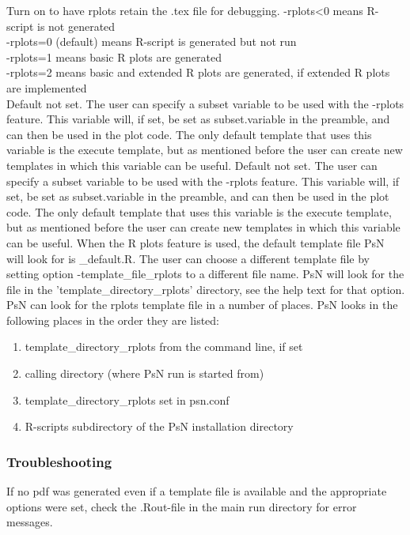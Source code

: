 \begin{optionlist}
Turn on to have rplots retain the .tex file for debugging.
\nextopt
{}
-rplots<0 means R-script is not generated\\ 
-rplots=0 (default) means R-script is generated but not run\\ 
-rplots=1 means basic R plots are generated\\													  
-rplots=2 means basic and extended R plots are generated, if extended R plots are implemented\\													  
\nextopt
{}
Default not set. The user can specify a subset variable to be used with the -rplots feature. This variable will, if set, be set as subset.variable in the preamble, and can then be used in the plot code. The only default template that uses this variable is the execute template, but as mentioned before the user can create new templates in which this variable can be useful.
\nextopt
{}
Default not set. The user can specify a subset variable to be used with the -rplots feature. This variable will, if set, be set as subset.variable in the preamble, and can then be used in the plot code.  The only default template that uses this variable is the execute template, but as mentioned before the user can create new templates in which this variable can be useful.
\nextopt
{}
When the R plots feature is used, the default template file PsN will look for is \guidetoolname\_default.R. The user can choose a different template file by setting option -template\_file\_rplots to a different file name. PsN will look for the file in the 'template\_directory\_rplots' directory, see the help text for that option.
\nextopt
{}
PsN can look for the rplots template file in a number of places. PsN looks in the following places in the order they are listed:
\begin{enumerate}
\item template\_directory\_rplots from the command line, if set 
\item calling directory (where PsN run is started from)
\item template\_directory\_rplots set in psn.conf 
\item R-scripts subdirectory of the PsN installation directory
\end{enumerate}
\nextopt

\end{optionlist}

\subsubsection*{Troubleshooting}
If no pdf was generated even if a template file is available and the appropriate options were set, check the .Rout-file in the main run directory for error messages.

